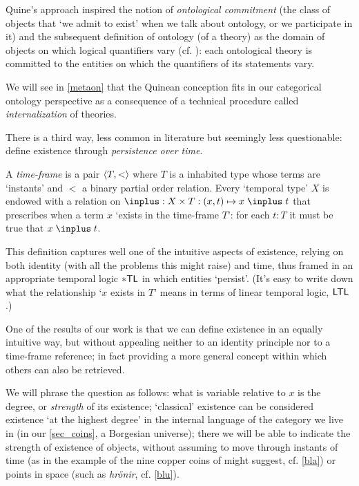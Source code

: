 Quine's approach inspired the notion of \emph{ontological commitment} (the class of objects that `we admit to exist' when we talk about ontology, or we participate in it) and the subsequent definition of ontology (of a theory) as the domain of objects on which logical quantifiers vary (cf. \cite{Qui53}): each ontological theory is committed to the entities on which the quantifiers of its statements vary.

We will see in \autoref{metaon} that the Quinean conception fits in our categorical ontology perspective as a consequence of a technical procedure called \emph{internalization} of theories.

There is a third way, less common in literature but seemingly less questionable: define existence through \emph{persistence over time}.

A \emph{time-frame} is a pair $\langle T, <\rangle$ where $T$ is a inhabited type whose terms are `instants' and $<$ a binary partial order relation. Every `temporal type' $X$ is endowed with a relation on $\inplus : X\times T : (x, t) \mapsto x \mathrel \inplus t $ that prescribes when a term $x$ `exists in the time-frame $T$': for each $t:T$ it must be true that $x\mathrel\inplus t$.

This definition captures well one of the intuitive aspects of existence, relying on both identity (with all the problems this might raise) and time, thus framed in an appropriate temporal logic $\sf *TL$ in which entities `persist'. (It's easy to write down what the relationship `$x$ exists in $T$' means in terms of linear temporal logic, $\sf LTL$.)

One of the results of our work is that we can define existence in an equally intuitive way, but without appealing neither to an identity principle nor to a time-frame reference; in fact providing a more general concept within which others can also be retrieved.

We will phrase the question as follows: what is variable relative to $x$ is the degree, or \emph{strength} of its existence; `classical' existence can be considered existence `at the highest degree' in the internal language of the category we live in (in our \autoref{sec_coins}, a Borgesian universe); there we will be able to indicate the strength of existence of objects, without assuming to move through instants of time (as in the example of the nine copper coins of \cite{tlonEN} might suggest, cf. \autoref{bla}) or points in space (such as \emph{hr\"onir}, cf. \autoref{blu}).

